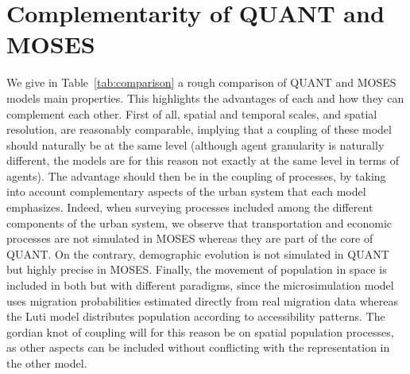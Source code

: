 \section{Complementarity of QUANT and MOSES}


We give in Table~\ref{tab:comparison} a rough comparison of QUANT and MOSES models main properties. This highlights the advantages of each and how they can complement each other. First of all, spatial and temporal scales, and spatial resolution, are reasonably comparable, implying that a coupling of these model should naturally be at the same level (although agent granularity is naturally different, the models are for this reason not exactly at the same level in terms of agents). The advantage should then be in the coupling of processes, by taking into account complementary aspects of the urban system that each model emphasizes. Indeed, when surveying processes included among the different components of the urban system, we observe that transportation and economic processes are not simulated in MOSES whereas they are part of the core of QUANT. On the contrary, demographic evolution is not simulated in QUANT but highly precise in MOSES. Finally, the movement of population in space is included in both but with different paradigms, since the microsimulation model uses migration probabilities estimated directly from real migration data whereas the Luti model distributes population according to accessibility patterns. The gordian knot of coupling will for this reason be on spatial population processes, as other aspects can be included without conflicting with the representation in the other model.



